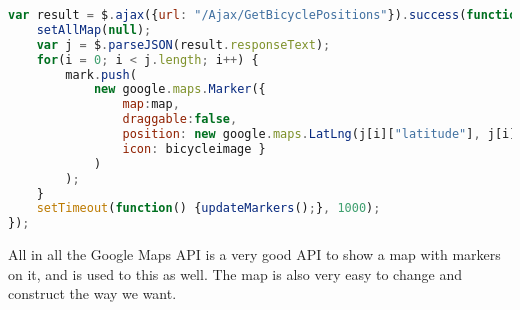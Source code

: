 \begin{minipage}{\textwidth}
\begin{lstlisting}[caption={Update the bicycles marker position}, label={lst:updatemarker}, language=Javascript]
var result = $.ajax({url: "/Ajax/GetBicyclePositions"}).success(function() {
	setAllMap(null);
	var j = $.parseJSON(result.responseText);
	for(i = 0; i < j.length; i++) {
		mark.push(
			new google.maps.Marker({ 
				map:map, 
				draggable:false, 
				position: new google.maps.LatLng(j[i]["latitude"], j[i]["longitude"]), 
				icon: bicycleimage }
			)
		);
	}
	setTimeout(function() {updateMarkers();}, 1000);
});
\end{lstlisting}
\end{minipage}

All in all the Google Maps API is a very good API to show a map with markers on it, and is used to this as well. 
The map is also very easy to change and construct the way we want.